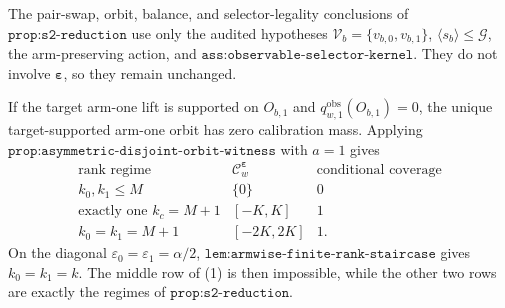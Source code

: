 The pair-swap, orbit, balance, and selector-legality conclusions of \(\texttt{prop:s2-reduction}\) use only the audited hypotheses \(\mathcal V_b=\{v_{b,0},v_{b,1}\}\), \(\langle s_b\rangle\le\mathcal G\), the arm-preserving action, and \(\texttt{ass:observable-selector-kernel}\). They do not involve \(\boldsymbol\varepsilon\), so they remain unchanged.

If the target arm-one lift is supported on \(O_{b,1}\) and \(q^{\mathrm{obs}}_{w,1}(O_{b,1})=0\), the unique target-supported arm-one orbit has zero calibration mass. Applying \(\texttt{prop:asymmetric-disjoint-orbit-witness}\) with \(a=1\) gives
\[
\begin{array}{c|c|c}
\text{rank regime}&\mathcal C^{\boldsymbol\varepsilon}_w&\text{conditional coverage}\\ \hline
k_0,k_1\le M&\{0\}&0\\
\text{exactly one }k_c=M+1&[-K,K]&1\\
k_0=k_1=M+1&[-2K,2K]&1.
\end{array}
\tag{1}
\]
On the diagonal \(\varepsilon_0=\varepsilon_1=\alpha/2\), \(\texttt{lem:armwise-finite-rank-staircase}\) gives \(k_0=k_1=k\). The middle row of (1) is then impossible, while the other two rows are exactly the regimes of \(\texttt{prop:s2-reduction}\).